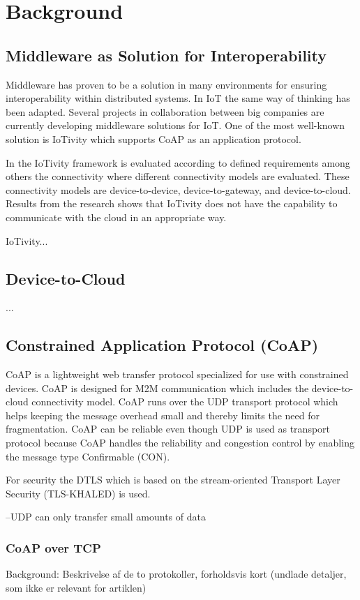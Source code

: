 \section{Background}




\subsection{Middleware as Solution for Interoperability}
Middleware has proven to be a solution in many environments for ensuring interoperability within distributed systems. In IoT the same way of thinking has been adapted. 
Several projects in collaboration between big companies are currently developing  middleware solutions for IoT. 
One of the most well-known solution is IoTivity which supports CoAP as an application protocol.
 
In \cite{interoperabilityChallenge} the IoTivity framework is evaluated according to defined requirements among others the connectivity where different connectivity models are evaluated. These connectivity models are device-to-device, device-to-gateway, and device-to-cloud. Results from the research shows that IoTivity does not have the capability to communicate with the cloud in an appropriate way. 

IoTivity...

\subsection{Device-to-Cloud}
...

\subsection{Constrained Application Protocol (CoAP)}
CoAP is a lightweight web transfer protocol specialized for use with constrained devices. CoAP is designed for M2M communication which includes the device-to-cloud connectivity model.
CoAP runs over the UDP transport protocol which helps keeping the message overhead small and thereby limits the need for fragmentation.
CoAP can be reliable even though UDP is used as transport protocol because CoAP handles the reliability and congestion control by enabling the message type Confirmable (CON).
 
For security the DTLS which is based on the stream-oriented Transport Layer Security (TLS-KHALED) is used.
 
--UDP can only transfer small amounts of data
\subsubsection{CoAP over TCP}

Background: Beskrivelse af de to protokoller, forholdsvis kort (undlade detaljer, som ikke er relevant for artiklen)


